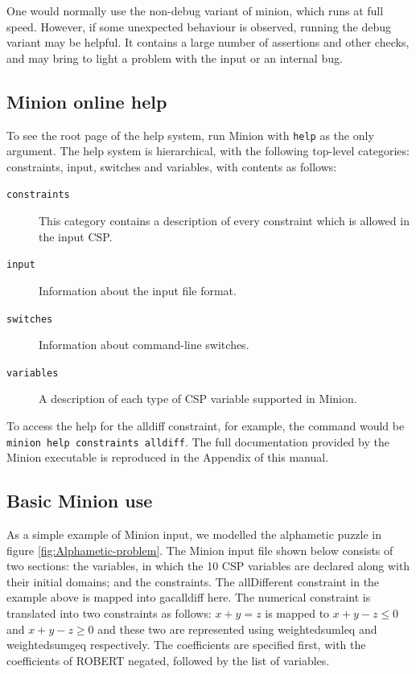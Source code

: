 \documentclass[oneside]{book}
\begin{document}
One would normally use the non-debug variant of minion, which runs
at full speed. However, if some unexpected behaviour is observed,
running the debug variant may be helpful. It contains a large number
of assertions and other checks, and may bring to light a problem with
the input or an internal bug.


\subsection{Minion online help}

To see the root page of the help system, run Minion with \texttt{help}
as the only argument. The help system is hierarchical, with the following
top-level categories: constraints, input, switches and variables,
with contents as follows:

\begin{description}
\item [{\texttt{constraints}}] This category contains a description of
every constraint which is allowed in the input CSP.
\item [{\texttt{input}}] Information about the input file format.
\item [{\texttt{switches}}] Information about command-line switches.
\item [{\texttt{variables}}] A description of each type of CSP variable
supported in Minion.
\end{description}
To access the help for the alldiff constraint, for example, the command
would be \texttt{minion help constraints alldiff}. The full documentation
provided by the Minion executable is reproduced in the Appendix of 
this manual.


\subsection{Basic Minion use}

As a simple example of Minion input, we modelled the alphametic puzzle
in figure \ref{fig:Alphametic-problem}. The Minion input file shown
below consists of two sections: the variables, in which the 10 CSP
variables are declared along with their initial domains; and the constraints.
The allDifferent constraint in the example above is mapped into gacalldiff
here. The numerical constraint is translated into two constraints
as follows: $x+y=z$ is mapped to $x+y-z\le0$ and $x+y-z\ge0$ and
these two are represented using weightedsumleq and weightedsumgeq
respectively. The coefficients are specified first, with the coefficients
of ROBERT negated, followed by the list of variables.
\end{document}
